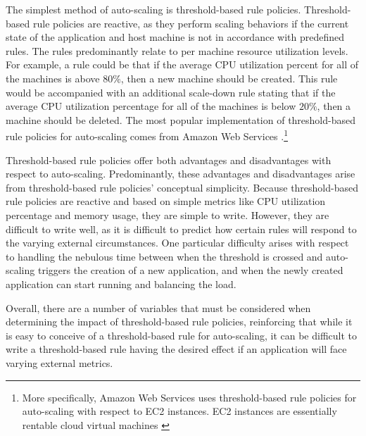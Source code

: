 The simplest method of auto-scaling is threshold-based rule policies.
Threshold-based rule policies are reactive, as they perform scaling behaviors if
the current state of the application and host machine
is not in accordance with predefined rules. The rules
predominantly relate to per machine resource utilization levels. For example, a
rule could be that if the average CPU utilization percent for all of the
machines is above $80\%$, then a new machine should be created. This rule would
be accompanied with an additional scale-down rule stating that if the average
CPU utilization percentage for all of the machines is below $20\%$, then a machine
should be deleted. The most popular implementation of threshold-based rule
policies for auto-scaling comes from Amazon Web Services
\cite{amazon-auto-scaling-developer-guide}.\footnote{More
specifically, Amazon Web Services uses threshold-based rule policies for
auto-scaling with respect to EC2 instances. EC2 instances are essentially
rentable cloud
virtual machines \cite{amazon-ec2}}

Threshold-based rule policies offer both advantages and disadvantages with
respect to auto-scaling. Predominantly, these advantages and disadvantages arise
from threshold-based rule policies' conceptual simplicity.
Because threshold-based rule policies are reactive and based on simple metrics
like CPU utilization percentage and memory usage, they are simple to write.
However, they are difficult to write well, as it is difficult to predict how
certain rules will respond to the varying external circumstances. One particular
difficulty arises with respect to handling the nebulous time between when the
threshold is crossed and auto-scaling triggers the creation of a new
application, and when the newly created application can start running and
balancing the load.

Overall, there are a number of variables that must be considered when
determining the impact of threshold-based rule policies, reinforcing
that while it is easy to conceive of a threshold-based rule for auto-scaling,
it can be difficult to write a threshold-based rule having the desired effect if
an application will face varying external metrics.

